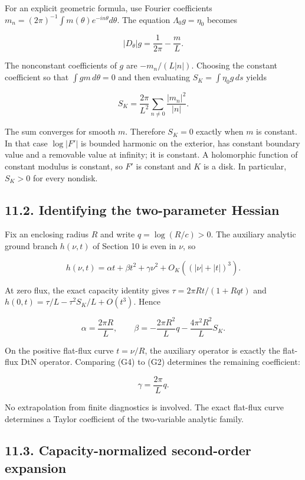 \documentclass[11pt]{article}
\begin{document}
For an explicit geometric formula, use Fourier coefficients
\(m_n=(2\pi)^{-1}\int m(\theta)e^{-in\theta}d\theta\). The equation
\(\Lambda_0g=\eta_0\) becomes

\[|D_\theta|g=\frac1{2\pi}-\frac mL.\]

The nonconstant coefficients of \(g\) are \(-m_n/(L|n|)\). Choosing the
constant coefficient so that \(\int gm\,d\theta=0\) and then evaluating
\(S_K=\int \eta_0g\,ds\) yields

\[S_K=\frac{2\pi}{L^2}\sum_{n\neq0}\frac{|m_n|^2}{|n|}.\tag{G3}\]

The sum converges for smooth \(m\). Therefore \(S_K=0\) exactly when
\(m\) is constant. In that case \(\log|F'|\) is bounded harmonic on the
exterior, has constant boundary value and a removable value at infinity;
it is constant. A holomorphic function of constant modulus is constant,
so \(F'\) is constant and \(K\) is a disk. In particular, \(S_K>0\) for
every nondisk.

\subsection{11.2. Identifying the two-parameter
Hessian}\label{identifying-the-two-parameter-hessian}

Fix an enclosing radius \(R\) and write \(q=\log(R/c)>0\). The auxiliary
analytic ground branch \(h(\nu,t)\) of Section 10 is even in \(\nu\), so

\[h(\nu,t)=\alpha t+\beta t^2+\gamma\nu^2+O_K((|\nu|+|t|)^3).\tag{G4}\]

At zero flux, the exact capacity identity gives
\(\tau=2\pi Rt/(1+Rq t)\) and \(h(0,t)=\tau/L-\tau^2S_K/L+O(t^3)\).
Hence

\[\alpha=\frac{2\pi R}{L},\qquad
\beta=-\frac{2\pi R^2}{L}q-\frac{4\pi^2R^2}{L}S_K.\]

On the positive flat-flux curve \(t=\nu/R\), the auxiliary operator is
exactly the flat-flux DtN operator. Comparing (G4) to (G2) determines
the remaining coefficient:

\[\gamma=\frac{2\pi}{L}q.\tag{G5}\]

No extrapolation from finite diagnostics is involved. The exact
flat-flux curve determines a Taylor coefficient of the two-variable
analytic family.

\subsection{11.3. Capacity-normalized second-order
expansion}\label{capacity-normalized-second-order-expansion}
\end{document}
